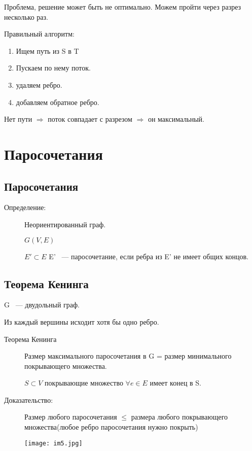 \documentclass[12pt]{article}
\begin{document}
\begin{description}
\begin{description}
Проблема, решение может быть не оптимально. Можем пройти через разрез несколько раз. 

Правильный алгоритм:

\begin{enumerate}
\item Ищем путь из S в T
\item Пускаем по нему поток.
\item удаляем ребро.
\item добавляем обратное ребро.
\end{enumerate}

Нет пути $\Rightarrow$ поток совпадает с разрезом $\Rightarrow$ он максимальный. 
\end{description}

\section{Паросочетания}
\subsection{Паросочетания}
\begin{description}
\item [Определение:] Неориентированный граф.

$G(V, E)$

$E' \subset E$ E' ~--- паросочетание, если ребра из E' не имеет общих концов.  

\end{description}

\subsection{Теорема Кенинга}

G ~--- двудольный граф.

Из каждый вершины исходит хотя бы одно ребро.

\begin{description}
\item[Теорема Кенинга] Размер максимального паросочетания в G = размер минимального покрывающего множества. 

$S \subset V$ покрывающие множество $\forall e \in E$ имеет конец в S.

\item[Доказательство:] Размер любого паросочетания $\le$ размера любого покрывающего множества(любое ребро паросочетания нужно покрыть)

\begin{center} 
\texttt{[image: im5.jpg]} 
\end{center}




\end{description}
\end{description}
\end{document}

